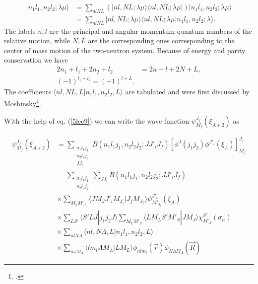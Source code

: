 \begin{subappendices}
\begin{equation}\label{5lec9}
\begin{split}
| n_1 l_1,n_2 l_2; \lambda \mu \rangle&= \sum_{n l N L} \left(| n l,N L; \lambda \mu \rangle \langle n l,N L; \lambda \mu |\right)
| n_1 l_1,n_2 l_2; \lambda \mu \rangle \\
&=\sum_{n l N L} | n l,N L; \lambda \mu \rangle \langle n l,N L; \lambda \mu | n_1 l_1,n_2 l_2; \lambda  \rangle.
\end{split}
\end{equation}
The labels $n,l$ are the principal and angular momentum quantum numbers of the relative motion, while $N,L$ are the corresponding ones corresponding to the center of mass motion of the two-neutron system. Because of energy and parity conservation we have
\begin{equation}\label{5lec10}
\begin{split}
2n_1+l_1+2n_2+l_2&=2n+l+2N+L,\\
(-1)^{l_1+l_2}=(-1)^{l+L}.
\end{split}
\end{equation}
The coefficients $\langle n l,N L, L | n_1 l_1,n_2 l_2, L  \rangle$ are tabulated and were first discussed by Moshinsky\footnote{\cite{Moshinsky:59}.}.
	

With the help of eq. (\ref{5lec9}) we can write the wave function $\psi_{M_f}^{J_f}(\xi_{A+2})$ as


\begin{equation}\label{5lec11}
\begin{split}
\psi_{M_f}^{J_f}(\xi_{A+2})&= \sum_{\substack{n_1 l_1 j_1\\n_2 l_2 j_2\\ J J_i}} B(n_1 l_1 j_1,n_2 l_2 j_2;JJ'_i J_f)
\left[ \phi^J(j_1 j_2) \phi^{J'_i}(\xi_A)\right]^{J_f}_{M_f}\\
&= \sum_{\substack{n_1 l_1 j_1\\n_2 l_2 j_2}} \sum_{J J_i }B(n_1 l_1 j_1,n_2 l_2 j_2;JJ'_i J_f)\\
& \times \sum_{M_J M'_{J_i}} \langle J M_J J'_i M_{J_i}|J_f M_{J_f}\rangle \psi_{M'_{J_i}}^{J'_i}(\xi_{A})\\
& \times \sum_{L S'} \langle S' L J |j_1 j_2 J \rangle \sum_{M_L M'_S} \langle L M_L S' M'_S |J M_J  \rangle \chi^{S'}_{M'_S}(\sigma_\alpha)\\
& \times \sum_{n l N \Lambda} \langle n l,N \Lambda, L |n_1 l_1,n_2 l_2, L \rangle \\
& \times \sum_{m_l  M_\Lambda}
\langle l m_l \Lambda M_\Lambda |L M_L \rangle \phi_{n l m_l}(\vec r) \phi_{N \Lambda M_\Lambda}(\vec R)
\end{split}
\end{equation}


\end{subappendices}
